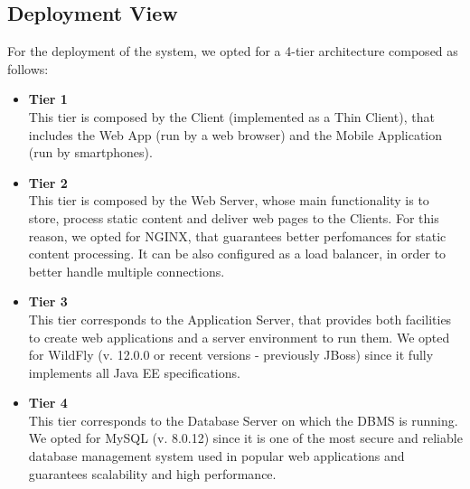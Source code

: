 \documentclass[12pt,a4paper]{article}
\begin{document}
	\subsection{Deployment View}
	For the deployment of the system, we opted for a 4-tier architecture composed as follows:
	\begin{itemize}
		\item \textbf{Tier 1}\\
		This tier is composed by the Client (implemented as a Thin Client), that includes the Web App (run by a web browser) and the Mobile Application (run by smartphones). 
		\item \textbf{Tier 2}\\
		This tier is composed by the Web Server, whose main functionality is to store, process static content and deliver web pages to the Clients. For this reason, we opted for NGINX, that guarantees better perfomances for static content processing. It can be also configured as a load balancer, in order to better handle multiple connections.
		\item \textbf{Tier 3}\\
		This tier corresponds to the Application Server, that provides both facilities to create web applications and a server environment to run them. We opted for WildFly (v. 12.0.0 or recent versions - previously JBoss) since it fully implements all Java EE specifications.
		\item \textbf{Tier 4}\\
		This tier corresponds to the Database Server on which the DBMS is running. We opted for MySQL (v. 8.0.12) since it is one of the most secure and reliable database management system used in popular web applications and guarantees scalability and high performance.
	\end{itemize}
\end{document}
